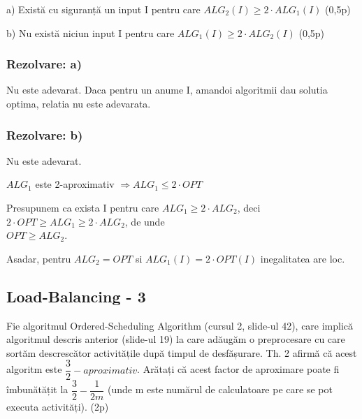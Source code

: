 \documentclass[a4paper]{article}
\begin{document}
a) Există cu siguranță un input I pentru care
$ALG_{2}(I) \geq 2 \cdot ALG_{1}(I)$ \hfill(0,5p)

b) Nu există niciun input I pentru care
$ALG_{1}(I) \geq 2 \cdot ALG_{2}(I)$ \hfill (0,5p)

\subsubsection*{Rezolvare: a)}
Nu este adevarat. Daca pentru un anume I, amandoi algoritmii dau solutia optima, relatia nu este adevarata.

\subsubsection*{Rezolvare: b)}
\begin{flushleft}
Nu este adevarat.

$ALG_{1}$ este 2-aproximativ $\Rightarrow ALG_{1} \leq 2 \cdot OPT$

Presupunem ca exista I pentru care $ALG_{1} \geq 2 \cdot ALG_{2}$, deci\\
$2 \cdot OPT \geq ALG_{1} \geq 2 \cdot ALG_{2}$, de unde\\
$OPT \geq ALG_{2}$.

Asadar, pentru $ALG_{2} = OPT$ si $ALG_{1}(I) = 2 \cdot OPT(I)$ inegalitatea are loc.
\end{flushleft}

\subsection{Load-Balancing - 3}
Fie algoritmul Ordered-Scheduling Algorithm (cursul 2, slide-ul 42),
care implică algoritmul descris anterior (slide-ul 19) la care adăugăm
o preprocesare cu care sortăm descrescător activitățile după timpul de
desfășurare. Th. 2 afirmă că acest algoritm este $\dfrac{3}{2}-aproximativ$. Arătați
că acest factor de aproximare poate fi îmbunătățit la $\dfrac{3}{2}-\dfrac{1}{2m}$ (unde m
este numărul de calculatoare pe care se pot executa activități). \hfill (2p)
\end{document}
